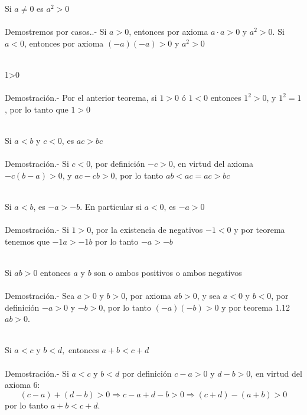\begin{enumerate}
\begin{teo}
Si $a\neq0$ es $a^2>0$\\\\
Demostremos por casos..- \;
Si $a>0$, entonces por axioma   \; $a\cdot a >0$ \; y \; $a^2>0$. Si $a<0$, entonces por axioma   \; $(-a)(-a)>0$ \; y  \; $a^2>0$\\\\
\end{teo}

\begin{teo}
1>0\\\\
Demostración.- \;
Por el anterior teorema, si $1>0$ ó $1<0$ entonces $1^2>0$, y $1^2=1$, por lo tanto que $1>0$\\\\
\end{teo}

\begin{teo}
Si $a<b$ y $c<0$, es $ac>bc$\\\\
Demostración.- \;
Si $c<0$, por definición $-c>0$, en virtud del axioma  $-c(b-a)>0$, y $ac-cb>0$, por lo tanto $ab<ac=ac>bc$\\\\
\end{teo}

\begin{teo}
Si $a<b$, es $-a>-b$. En particular si $a<0$, es $-a>0$\\\\
Demostración.- \;
Si $1>0$, por la existencia de negativos $-1<0$ y por teorema  tenemos que $-1a>-1b$ por lo tanto $-a>-b$ \\\\
\end{teo}

\begin{teo}
Si $ab>0$ entonces $a$ y $b$ son o ambos positivos o ambos negativos\\\\
Demostración.- \;
Sea $a>0$ y $b>0$, por axioma  \;  $ab>0$, y sea $a<0$ y $b<0$, por definición $-a>0$ y $-b>0$, por lo tanto $(-a)(-b)>0$ y por teorema 1.12 \; $ab>0$.\\\\
\end{teo}

\begin{teo}
Si $a<c$ y $b<d,$ entonces $a+b<c+d$\\\\
Demostración.- \;
Si $a<c$ \; y \; $b<d$ por definición $c-a>0$ \; y \; $d-b>0$, en virtud del axioma 6:
$$(c-a)+(d-b)>0 \Rightarrow c-a+d-b>0 \Rightarrow (c+d)-(a+b)>0$$ 
por lo tanto $a+b<c+d$.\\\\ 
\end{teo}


\end{enumerate}
